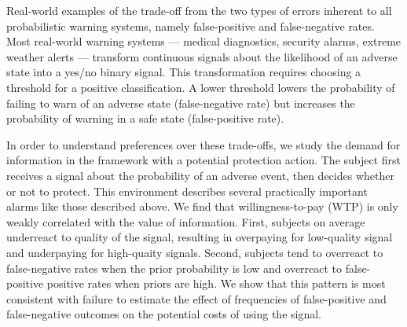 \documentclass[12pt,a4paper]{article}
\begin{document}
Real-world examples of the trade-off from the two types of errors inherent to all probabilistic warning systems, namely false-positive and false-negative rates.  Most real-world warning systems --- medical diagnostics, security alarms, extreme weather alerts --- transform continuous signals about the likelihood of an adverse state into a yes/no binary signal. This transformation requires choosing a threshold for a positive classification. A lower threshold lowers the probability of failing to warn of an adverse state (false-negative rate) but increases the probability of warning in a safe state (false-positive rate). 

In order to understand preferences over these trade-offs, we study the demand for information in the framework with a potential protection action. The subject first receives a signal about the probability of an adverse event, then decides whether or not to protect. This environment describes several practically important alarms like those described above. We find that willingness-to-pay (WTP) is only weakly correlated with the value of information. First, subjects on average underreact to quality of the signal, resulting in overpaying for low-quality signal and underpaying for high-quaity signals. Second, subjects tend to overreact to false-negative rates when the prior probability is low and overreact to false-positive positive rates when priors are high. We show that this pattern is most consistent with failure to estimate the effect of frequencies of false-positive and false-negative outcomes on the potential costs of using the signal. 

\end{document}
